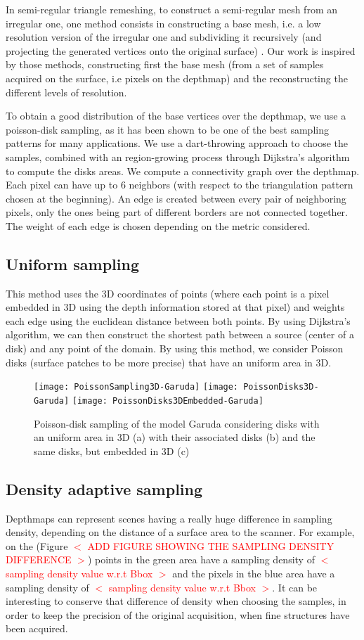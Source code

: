 \documentclass[11pt,fleqn]{book} %
\newcommand{\arnaud}[1]{\textcolor{red}{$<$ #1 $>$}}
\begin{document}
In semi-regular triangle remeshing, to construct a semi-regular mesh from an irregular one, one method consists in constructing a base mesh, i.e. a low resolution version of the irregular one and subdividing it recursively (and projecting the generated vertices onto the original surface) \cite{PRS15}. Our work is inspired by those methods, constructing first the base mesh (from a set of samples acquired on the surface, i.e pixels on the depthmap) and the reconstructing the different levels of resolution.

To obtain a good distribution of the base vertices over the depthmap, we use a poisson-disk sampling, as it has been shown to be one of the best sampling patterns for many applications. 
We use a dart-throwing approach to choose the samples, combined with an region-growing process through Dijkstra's algorithm \cite{Dij59} to compute the disks areas.
We compute a connectivity graph over the depthmap. Each pixel can have up to 6 neighbors (with respect to the triangulation pattern chosen at the beginning).
An edge is created between every pair of neighboring pixels, only the ones being part of different borders are not connected together. 
The weight of each edge is chosen depending on the metric considered.

\subsection{Uniform sampling}
This method uses the 3D coordinates of points (where each point is a pixel embedded in 3D using the depth information stored at that pixel) and weights each edge using the euclidean distance between both points.
By using Dijkstra's algorithm, we can then construct the shortest path between a source (center of a disk) and any point of the domain. 
By using this method, we consider Poisson disks (surface patches to be more precise) that have an uniform area in 3D.

\begin{figure}[ht]
\centering
\texttt{[image: PoissonSampling3D-Garuda]}
\texttt{[image: PoissonDisks3D-Garuda]}
\texttt{[image: PoissonDisks3DEmbedded-Garuda]}
\caption{Poisson-disk sampling of the model Garuda considering disks with an uniform area in 3D (a) with their associated disks (b) and the same disks, but embedded in 3D (c)}
\label{fig:poisson_sampling_3d}
\end{figure}

\subsection{Density adaptive sampling}
Depthmaps can represent scenes having a really huge difference in sampling density, depending on the distance of a surface area to the scanner. 
For example, on the (Figure \arnaud{ADD FIGURE SHOWING THE SAMPLING DENSITY DIFFERENCE}) points in the green area have a sampling density of \arnaud{sampling density value w.r.t Bbox} and the pixels in the blue area have a sampling density of \arnaud{sampling density value w.r.t Bbox}. It can be interesting to conserve that difference of density when choosing the samples, in order to keep the precision of the original acquisition, when fine structures have been acquired.
\end{document}
